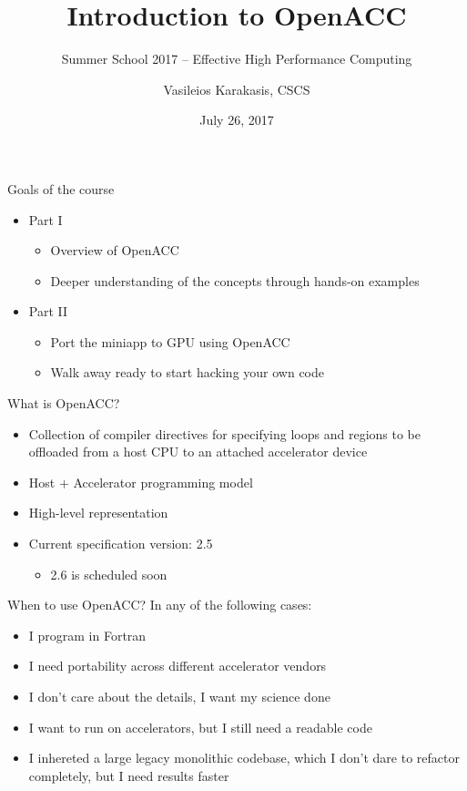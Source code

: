 \documentclass[12pt,aspectratio=169]{beamer}
\author{Vasileios Karakasis, CSCS}
\title{Introduction to OpenACC}
\subtitle{Summer School 2017 -- Effective High Performance Computing}
\date{July 26, 2017}
\begin{document}
\cscstitle

\begin{frame}{Goals of the course}
  \begin{itemize}
  \item Part I
    \begin{itemize}
    \item Overview of OpenACC
    \item Deeper understanding of the concepts through hands-on examples
    \end{itemize}
    \vspace\baselineskip
  \item  Part II
    \begin{itemize}
    \item Port the miniapp to GPU using OpenACC
    \item Walk away ready to start hacking your own code
    \end{itemize}
  \end{itemize}
\end{frame}

\begin{frame}{What is OpenACC?}
  \begin{itemize}
  \item Collection of compiler directives for specifying loops and regions to be
    offloaded from a host CPU to an attached accelerator device
  \item Host + Accelerator programming model
  \item High-level representation
  \item Current specification version: 2.5
    \begin{itemize}
    \item 2.6 is scheduled soon
    \end{itemize}
  \end{itemize}
\end{frame}

\begin{frame}{When to use OpenACC?}
  In any of the following cases:
  \vspace\baselineskip
  \begin{itemize}
  \item I program in Fortran
  \item I need portability across different accelerator vendors
  \item I don't care about the details, I want my science done
  \item I want to run on accelerators, but I still need a readable code
  \item I inhereted a large legacy monolithic codebase, which I don't dare to
    refactor completely, but I need results faster
  \end{itemize}
\end{frame}
\end{document}
